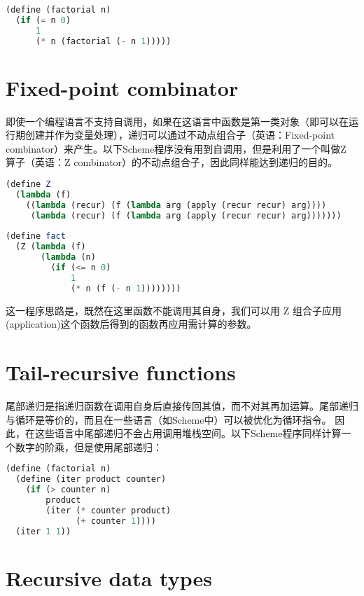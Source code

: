 \begin{lstlisting}[language=Scheme]
(define (factorial n)
  (if (= n 0)
      1
      (* n (factorial (- n 1)))))
\end{lstlisting}



\section{Fixed-point combinator}


即使一个编程语言不支持自调用，如果在这语言中函数是第一类对象（即可以在运行期创建并作为变量处理），递归可以通过不动点组合子（英语：Fixed-point combinator）来产生。以下Scheme程序没有用到自调用，但是利用了一个叫做Z 算子（英语：Z combinator）的不动点组合子，因此同样能达到递归的目的。

\begin{lstlisting}[language=Scheme]
(define Z
  (lambda (f)
    ((lambda (recur) (f (lambda arg (apply (recur recur) arg))))
     (lambda (recur) (f (lambda arg (apply (recur recur) arg)))))))
 
(define fact
  (Z (lambda (f)
       (lambda (n)
         (if (<= n 0)
             1
             (* n (f (- n 1))))))))
\end{lstlisting}


这一程序思路是，既然在这里函数不能调用其自身，我们可以用 Z 组合子应用(application)这个函数后得到的函数再应用需计算的参数。

\section{Tail-recursive functions}


尾部递归是指递归函数在调用自身后直接传回其值，而不对其再加运算。尾部递归与循环是等价的，而且在一些语言（如Scheme中）可以被优化为循环指令。 因此，在这些语言中尾部递归不会占用调用堆栈空间。以下Scheme程序同样计算一个数字的阶乘，但是使用尾部递归：


\begin{lstlisting}[language=Scheme]
(define (factorial n)
  (define (iter product counter)
    (if (> counter n)
        product
        (iter (* counter product)
              (+ counter 1))))
  (iter 1 1))
\end{lstlisting}


\section{Recursive data types}



